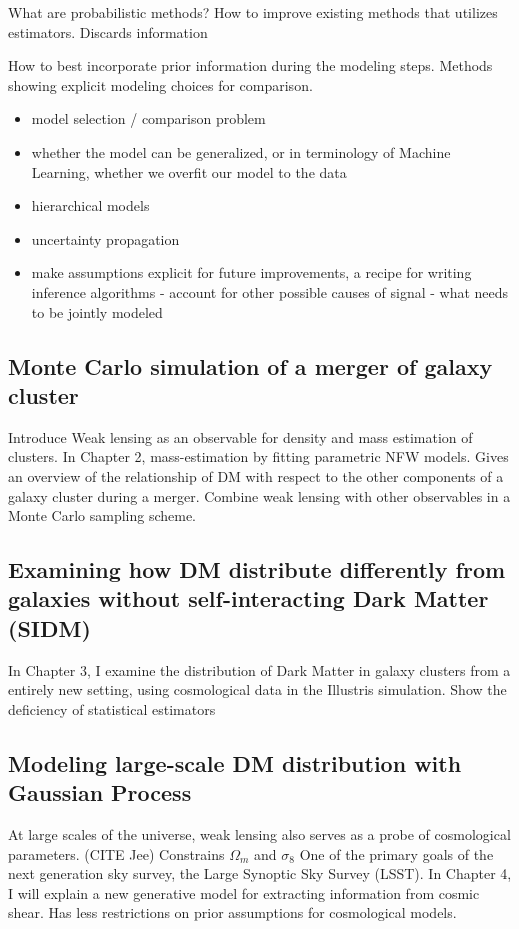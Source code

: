 \documentclass[ucdthesis.tex]{subfiles}
\begin{document}
		What are probabilistic methods?
		How to improve existing methods that utilizes estimators. 
		Discards information 

		How to best incorporate prior information during the modeling steps. 
		Methods showing explicit modeling choices for comparison. 
		
		\begin{itemize}
		\item model selection / comparison problem
		\item whether the model can be generalized, or in terminology of Machine
			Learning, whether we overfit our model to the data 
		\item hierarchical models 
		\item uncertainty propagation 
		\item make assumptions explicit for future improvements, a recipe for writing
		inference algorithms - account for other possible causes of signal 
		- what needs to be jointly modeled 
		\end{itemize}

		\subsection{Monte Carlo simulation of a merger of galaxy cluster}
		Introduce Weak lensing as an observable for density and mass estimation of
		clusters. In Chapter 2, mass-estimation by fitting parametric NFW models. 
		Gives an overview of the relationship of DM with respect to the other
		components of a galaxy cluster during a merger. Combine weak lensing with
		other observables in a Monte Carlo sampling scheme.

		\subsection{Examining how DM distribute differently from galaxies without 
		self-interacting Dark Matter (SIDM)}
		In Chapter 3, I examine the distribution of Dark Matter in galaxy clusters
		from a entirely new setting, using cosmological data in the Illustris
		simulation. Show the deficiency of statistical estimators 

		\subsection{Modeling large-scale DM distribution with Gaussian Process}
		At large scales of the universe, weak lensing also serves as a probe of 
		cosmological parameters.  (CITE Jee)
		Constrains $\Omega_m$ and $\sigma_8$ 
		One of the primary goals of the next generation sky survey, the Large
		Synoptic Sky Survey (LSST). In Chapter 4, I will explain a new generative
		model for extracting information from cosmic shear. 
	  Has less restrictions on prior assumptions for cosmological models.	


        
	  {}
\end{document}
